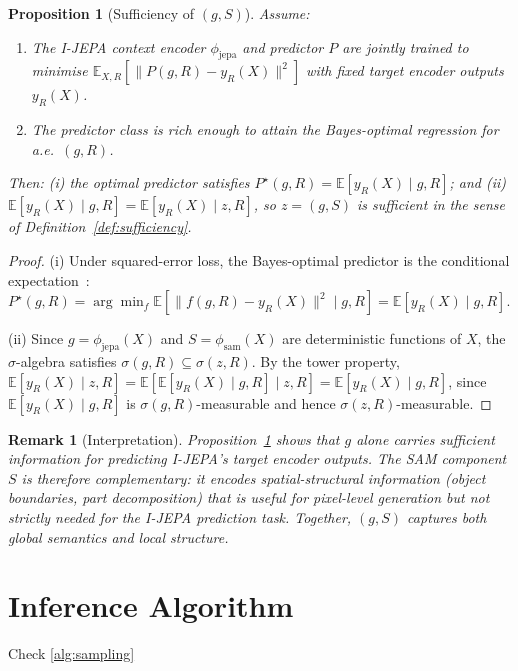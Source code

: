 \documentclass[12pt]{article}
\newtheorem{remark}{Remark}
\newtheorem{proposition}{Proposition}
\begin{document}
\begin{proposition}[Sufficiency of $(g, S)$]
\label{prop:sufficiency}
Assume:
\begin{enumerate}
    \item[\textup{(A1)}] The I-JEPA context encoder $\phi_{\mathrm{jepa}}$
    and predictor $P$ are jointly trained to minimise
    $\mathbb{E}_{X, R}[\lVert P(g, R) - y_R(X) \rVert^2]$
    with fixed target encoder outputs $y_R(X)$.
    \item[\textup{(A2)}] The predictor class is rich enough to attain the
    Bayes-optimal regression for a.e.\ $(g, R)$.
\end{enumerate}
Then: (i) the optimal predictor satisfies
$P^\star(g, R) = \mathbb{E}[y_R(X) \mid g, R]$; and
(ii) $\mathbb{E}[y_R(X) \mid g, R] = \mathbb{E}[y_R(X) \mid z, R]$,
so $z = (g, S)$ is sufficient in the sense of
Definition~\ref{def:sufficiency}.
\end{proposition}

\begin{proof}
(i) Under squared-error loss, the Bayes-optimal predictor is the
conditional expectation~\cite{lehmann2006theory}:
$P^\star(g, R) = \arg\min_{f} \mathbb{E}[\lVert f(g, R) - y_R(X) \rVert^2 \mid g, R]
= \mathbb{E}[y_R(X) \mid g, R]$.

(ii) Since $g = \phi_{\mathrm{jepa}}(X)$ and $S = \phi_{\mathrm{sam}}(X)$
are deterministic functions of $X$, the $\sigma$-algebra satisfies
$\sigma(g, R) \subseteq \sigma(z, R)$.
By the tower property,
$\mathbb{E}[y_R(X) \mid z, R]
= \mathbb{E}[\mathbb{E}[y_R(X) \mid g, R] \mid z, R]
= \mathbb{E}[y_R(X) \mid g, R]$,
since $\mathbb{E}[y_R(X) \mid g, R]$ is $\sigma(g, R)$-measurable
and hence $\sigma(z, R)$-measurable.
\end{proof}

\begin{remark}[Interpretation]
Proposition~\ref{prop:sufficiency} shows that $g$ alone carries
sufficient information for predicting I-JEPA's target encoder outputs.
The SAM component $S$ is therefore \emph{complementary}: it encodes
spatial-structural information (object boundaries, part decomposition)
that is useful for pixel-level generation but not strictly needed for
the I-JEPA prediction task.
Together, $(g, S)$ captures both global semantics and local structure.
\end{remark}

\section{Inference Algorithm}
Check \ref{alg:sampling}
\label{sec:inference}
\end{document}
